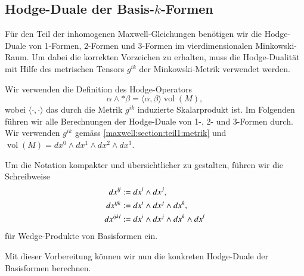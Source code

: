 \subsection{Hodge-Duale der Basis-$k$-Formen}
Für den Teil der inhomogenen Maxwell-Gleichungen benötigen wir die Hodge-Duale von 1-Formen, 2-Formen und 3-Formen im vierdimensionalen Minkowski-Raum.
Um dabei die korrekten Vorzeichen zu erhalten, muss die Hodge-Dualität mit Hilfe des metrischen Tensors $g^{ik}$  der Minkowski-Metrik verwendet werden.

Wir verwenden die Definition des Hodge-Operators
\begin{equation*}
	\alpha \wedge \ast \beta = \langle \alpha, \beta \rangle \operatorname{vol}(M),
\end{equation*}
wobei $\langle \cdot , \cdot \rangle$ das durch die Metrik $g^{ik}$ induzierte Skalarprodukt ist.
Im Folgenden führen wir alle Berechnungen der Hodge-Duale von 1-, 2- und 3-Formen durch.
Wir verwenden $g^{ik}$ gemäss \eqref{maxwell:section:teil1:metrik} und $\operatorname{vol}(M) = dx^0 \wedge dx^1 \wedge dx^2 \wedge dx^3$.
\begin{definition}
\label{maxwell:hodge:kurzschreibweise}
Um die Notation kompakter und übersichtlicher zu gestalten, führen wir die Schreibweise
\begin{align*}
	dx^{i\!j} &:= dx^i \wedge dx^j, 
	\\
	dx^{i\!jk} &:= dx^i \wedge dx^j \wedge dx^k, 
	\\
	dx^{i\!jkl} & := dx^i \wedge dx^j \wedge dx^k \wedge dx^l
	\notag
\end{align*}
für Wedge-Produkte von Basisformen ein.
\end{definition}
Mit dieser Vorbereitung können wir nun die konkreten Hodge-Duale der Basisformen berechnen.
